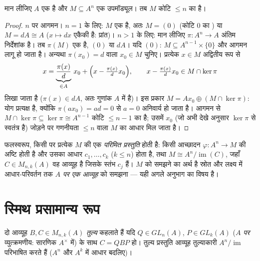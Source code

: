 \begin{theorem}[मुक्त मॉड्यूलों के उपमॉड्यूल]\label{thm:b3:modules:submodule}
मान लीजिए $A$ एक  है और $M \subseteq A^n$ एक उपमॉड्यूल। तब $M$ कोटि
$\leq n$ का  है।
\end{theorem}

\begin{proof}
$n$ पर आगमन। $n = 1$ के लिए: $M$ एक  है, अतः $M = (0)$ (कोटि
$0$ का ) या $M = dA \cong A$ ($x \mapsto dx$ एकैकी है: प्रांत)। $n > 1$ के लिए:
मान लीजिए $\pi \colon A^n \to A$ अंतिम निर्देशांक है। तब $\pi(M)$ एक  है, $(0)$
या $dA$। यदि $(0)$: $M \subseteq A^{n-1} \times \{0\}$ और आगमन लागू हो जाता है। अन्यथा $\pi(x_0) = d$
वाला $x_0 \in M$ चुनिए। प्रत्येक $x \in M$ अद्वितीय रूप से
\[
x = \underbrace{\frac{\pi(x)}{d}}_{\in A}\, x_0 +
\Bigl(x - \tfrac{\pi(x)}d x_0\Bigr),
\qquad x - \tfrac{\pi(x)}d x_0 \in M \cap \ker\pi
\]
लिखा जाता है ($\pi(x) \in dA$, अतः गुणांक $A$ में है)। इस प्रकार $M = Ax_0
\oplus (M \cap \ker \pi)$:
योग प्रत्यक्ष है, क्योंकि $\pi(ax_0) =
ad = 0$ से $a = 0$ अनिवार्य हो जाता है।
आगमन से $M \cap \ker\pi \subseteq
\ker \pi \cong A^{n-1}$ कोटि $\leq n - 1$ का  है; उसमें $x_0$
(जो अभी देखे अनुसार $\ker\pi$ से स्वतंत्र है) जोड़ने पर गणनीयता
$\leq n$ वाला $M$ का आधार मिल जाता है।
\end{proof}

\begin{remark}\label{rem:b3:modules:presentation}
फलस्वरूप, किसी  पर प्रत्येक  $M$ की एक
\emph{परिमित प्रस्तुति} होती है: किसी आच्छादन $\varphi\colon A^n \to M$ की अष्टि
 होती है और उसका आधार $c_1, \dots, c_k$ ($k \leq n$) होता है, तथा $M
\cong A^n / \operatorname{im}(C)$,
जहाँ $C \in M_{n,k}(A)$ वह आव्यूह है जिसके स्तंभ $c_j$ हैं। $M$ को समझने का
अर्थ है स्रोत और लक्ष्य में आधार-परिवर्तन तक \emph{$A$ पर एक
आव्यूह} को समझना --- यही अगले अनुभाग का विषय है।
\end{remark}

\section{स्मिथ प्रसामान्य रूप}

\begin{definition}\label{def:b3:modules:equivalence}
दो आव्यूह $B, C \in M_{n,k}(A)$ \emph{तुल्य} कहलाते हैं यदि $Q \in GL_n(A)$, $P \in GL_k(A)$
(\emph{$A$ पर} व्युत्क्रमणीय: सारणिक $A^\times$ में) के साथ $C =
QBP$
हो। तुल्य प्रस्तुति आव्यूह तुल्याकारी  $A^n/
\operatorname{im}$ परिभाषित
करते हैं ($A^n$ और $A^k$ में आधार बदलिए)।
\end{definition}

